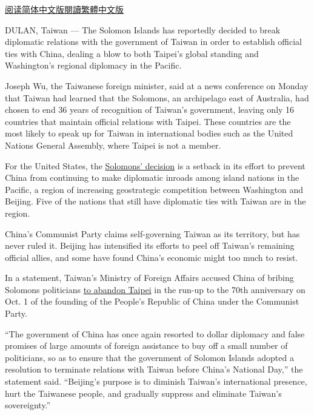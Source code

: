 \href{https://cn.nytimes.com/asia-pacific/20190917/solomon-islands-taiwan-china/}{阅读简体中文版}\href{https://cn.nytimes.com/asia-pacific/20190917/solomon-islands-taiwan-china/zh-hant/}{閱讀繁體中文版}

DULAN, Taiwan --- The Solomon Islands has reportedly decided to break
diplomatic relations with the government of Taiwan in order to establish
official ties with China, dealing a blow to both Taipei's global
standing and Washington's regional diplomacy in the Pacific.

Joseph Wu, the Taiwanese foreign minister, said at a news conference on
Monday that Taiwan had learned that the Solomons, an archipelago east of
Australia, had chosen to end 36 years of recognition of Taiwan's
government, leaving only 16 countries that maintain official relations
with Taipei. These countries are the most likely to speak up for Taiwan
in international bodies such as the United Nations General Assembly,
where Taipei is not a member.

For the United States, the
\href{https://www.nytimes.com/2019/09/05/world/asia/taiwan-solomon-islands.html}{Solomons'
decision} is a setback in its effort to prevent China from continuing to
make diplomatic inroads among island nations in the Pacific, a region of
increasing geostrategic competition between Washington and Beijing. Five
of the nations that still have diplomatic ties with Taiwan are in the
region.

China's Communist Party claims self-governing Taiwan as its territory,
but has never ruled it. Beijing has intensified its efforts to peel off
Taiwan's remaining official allies, and some have found China's economic
might too much to resist.

In a statement, Taiwan's Ministry of Foreign Affairs accused China of
bribing Solomons politicians
\href{https://www.nytimes.com/2019/03/20/world/asia/taiwan-south-pacific-tsai-ing-wen-china.html}{to
abandon Taipei} in the run-up to the 70th anniversary on Oct. 1 of the
founding of the People's Republic of China under the Communist Party.

``The government of China has once again resorted to dollar diplomacy
and false promises of large amounts of foreign assistance to buy off a
small number of politicians, so as to ensure that the government of
Solomon Islands adopted a resolution to terminate relations with Taiwan
before China's National Day,'' the statement said. ``Beijing's purpose
is to diminish Taiwan's international presence, hurt the Taiwanese
people, and gradually suppress and eliminate Taiwan's sovereignty.''

